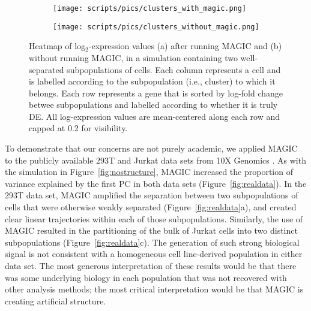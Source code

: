 \documentclass[10pt,letterpaper]{article}
\begin{document}
\begin{figure}[btp]
\centering
\begin{subfigure}[b]{0.49\textwidth}
    \texttt{[image: scripts/pics/clusters\_with\_magic.png]}
    \caption{}
\end{subfigure}
\begin{subfigure}[b]{0.49\textwidth}
    \texttt{[image: scripts/pics/clusters\_without\_magic.png]}
    \caption{}
\end{subfigure}
\caption{Heatmap of log$_2$-expression values (a) after running MAGIC and (b) without running MAGIC, in a simulation containing two well-separated subpopulations of cells.
Each column represents a cell and is labelled according to the subpopulation (i.e., cluster) to which it belongs.
Each row represents a gene that is sorted by log-fold change betwee subpopulations and labelled according to whether it is truly DE.
All log-expression values are mean-centered along each row and capped at 0.2 for visibility.}
\label{fig:twoclusters}
\end{figure}

To demonstrate that our concerns are not purely academic, we applied MAGIC to the publicly available 293T and Jurkat data sets from 10X Genomics \cite{zheng2017massively}.
As with the simulation in Figure~\ref{fig:nostructure}, MAGIC increased the proportion of variance explained by the first PC in both data sets (Figure~\ref{fig:realdata}).
In the 293T data set, MAGIC amplified the separation between two subpopulations of cells that were otherwise weakly separated (Figure~\ref{fig:realdata}a),
and created clear linear trajectories within each of those subpopulations.
Similarly, the use of MAGIC resulted in the partitioning of the bulk of Jurkat cells into two distinct subpopulations (Figure~\ref{fig:realdata}c).
The generation of such strong biological signal is not consistent with a homogeneous cell line-derived population in either data set.
The most generous interpretation of these results would be that there was some underlying biology in each population that was not recovered with other analysis methods;
the most critical interpretation would be that MAGIC is creating artificial structure.
\end{document}
